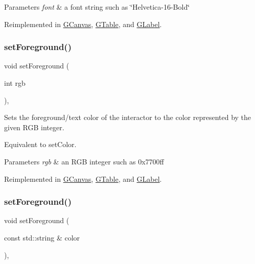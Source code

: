 \begin{DoxyParams}{Parameters}
{\em font} & a font string such as \char`\"{}\+Helvetica-\/16-\/\+Bold\char`\"{} \\
\hline
\end{DoxyParams}


Reimplemented in \mbox{\hyperlink{classGCanvas_a51367c9fd2709973b1f7238734f93891}{G\+Canvas}}, \mbox{\hyperlink{classGTable_a51367c9fd2709973b1f7238734f93891}{G\+Table}}, and \mbox{\hyperlink{classGLabel_a51367c9fd2709973b1f7238734f93891}{G\+Label}}.

\mbox{\label{classGInteractor_a9eb856b5ff83a19df3831a31f15f4563}} 
\subsubsection{\texorpdfstring{set\+Foreground()}{setForeground()}\hspace{0.1cm}{\footnotesize\ttfamily [1/2]}}
{\footnotesize\ttfamily void set\+Foreground (\begin{DoxyParamCaption}\item[{int}]{rgb }\end{DoxyParamCaption})\hspace{0.3cm}{\ttfamily [virtual]}, {\ttfamily [inherited]}}



Sets the foreground/text color of the interactor to the color represented by the given R\+GB integer. 

Equivalent to set\+Color. 
\begin{DoxyParams}{Parameters}
{\em rgb} & an R\+GB integer such as 0x7700ff \\
\hline
\end{DoxyParams}


Reimplemented in \mbox{\hyperlink{classGCanvas_a59f7cd2bd1708c12dfa52a8f7c7b79c9}{G\+Canvas}}, \mbox{\hyperlink{classGTable_a59f7cd2bd1708c12dfa52a8f7c7b79c9}{G\+Table}}, and \mbox{\hyperlink{classGLabel_a59f7cd2bd1708c12dfa52a8f7c7b79c9}{G\+Label}}.

\mbox{\label{classGInteractor_af59209aeadea6dfc6d97a2d8531f50e1}} 
\subsubsection{\texorpdfstring{set\+Foreground()}{setForeground()}\hspace{0.1cm}{\footnotesize\ttfamily [2/2]}}
{\footnotesize\ttfamily void set\+Foreground (\begin{DoxyParamCaption}\item[{const std\+::string \&}]{color }\end{DoxyParamCaption})\hspace{0.3cm}{\ttfamily [virtual]}, {\ttfamily [inherited]}}



